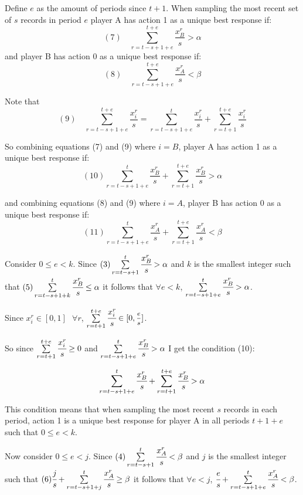 \documentclass{article}
\begin{document}
\vskip12pt

Define $e$ as the amount of periods since $t+1$. When sampling the most recent set of $s$ records in period $e$ player A has action 1 as a unique best response if: 
$$(7) \hspace{12pt} \sum\limits_{r=t-s+1+e}^{t+e} \frac{x^r_B}{s} > \alpha$$
and player B has action 0 as a unique best response if:
$$(8) \hspace{12pt} \sum\limits_{r=t-s+1+e}^{t+e} \frac{x^r_A}{s} < \beta$$

Note that
$$(9) \hspace{12pt} \sum\limits_{r=t-s+1+e}^{t+e} \frac{x^r_i}{s} = \sum\limits_{r=t-s+1+e}^{t}\frac{x^r_i}{s}+\sum\limits_{r=t+1}^{t+e} \frac{x^r_i}{s}$$

So combining equations (7) and (9) where $i=B$, player A has action 1 as a unique best response if: 
$$(10) \sum\limits_{r=t-s+1+e}^{t}\frac{x^r_B}{s}+\sum\limits_{r=t+1}^{t+e} \frac{x^r_B}{s} > \alpha$$

and combining equations (8) and (9) where $i=A$, player B has action 0 as a unique best response if:
$$(11) \sum\limits_{r=t-s+1+e}^{t}\frac{x^r_A}{s}+\sum\limits_{r=t+1}^{t+e} \frac{x^r_A}{s} < \beta$$

\vskip18pt

Consider $0 \leq e<k$. Since $(3) \sum\limits_{r=t-s+1}^{t} \cfrac{x^r_B}{s} > \alpha$ and $k$ is the smallest integer such that $(5) \sum\limits_{r=t-s+1+k}^{t} \cfrac{x^r_B}{s} \leq \alpha$ it follows that $\forall e<k$, $\sum\limits_{r=t-s+1+e}^{t} \cfrac{x^r_B}{s} > \alpha$.

Since $x_i^r \in [0,1] \hspace{8pt} \forall r$, $\sum\limits_{r=t+1}^{t+e} \cfrac{x^r_i}{s} \in [0,\mfrac{e}{s}]$.

So since $\sum\limits_{r=t+1}^{t+e} \cfrac{x^r_i}{s} \geq 0$ and $\sum\limits_{r=t-s+1+e}^{t} \cfrac{x^r_B}{s} > \alpha$ I get the condition (10):

$$\sum\limits_{r=t-s+1+e}^{t}\cfrac{x^r_B}{s}+\sum\limits_{r=t+1}^{t+e} \cfrac{x^r_B}{s} > \alpha$$

This condition means that when sampling the most recent $s$ records in each period, action 1 is a unique best response for player A in all periods $t+1+e$ such that $0 \leq e<k$.

\vskip18pt

Now consider $0 \leq e<j$. Since $(4) \sum\limits_{r=t-s+1}^{t} \cfrac{x^r_A}{s} < \beta$ and $j$ is the smallest integer such that $(6) \cfrac{j}{s}+\sum\limits_{r=t-s+1+j}^{t} \cfrac{x^r_A}{s} \geq \beta$ it follows that $\forall e<j$, $\cfrac{e}{s}+\sum\limits_{r=t-s+1+e}^{t} \cfrac{x^r_A}{s} < \beta$.
\end{document}
